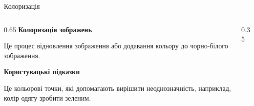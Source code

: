 \documentclass[10pt, aspectratio=169, xcolor=table]{beamer}
\begin{document}
    \begin{frame}[plain]
        \maketitle
    \end{frame}

    \begin{frame}{Колоризація}
        \begin{columns}[T]
            \begin{column}{0.65\textwidth}
                \textbf{Колоризація зображень}

                Це процес відновлення зображення або додавання кольору до чорно-білого зображення.
                
                \vspace{1em}
                \textbf{Користувацькі підказки}

                Це кольорові точки, які допомагають вирішити неоднозначність, наприклад, колір одягу зробити зеленим.
            \end{column}

            \begin{column}{0.35\textwidth}
                \centering
                \begin{tikzpicture}[
                    arrow/.style={->, ultra thick, >=stealth, color=white}
                ]


\end{tikzpicture}
\end{column}
\end{columns}
\end{frame}
\end{document}
